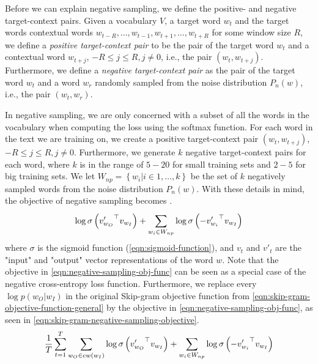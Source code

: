 Before we can explain negative sampling, we define the positive- and negative target-context pairs. Given a vocabulary $V$, a target word $w_t$ and the target words contextual words $w_{t-R}, \ldots, w_{t-1}, w_{t+1}, \ldots, w_{t+R}$ for some window size $R$, we define a \textit{positive target-context pair} to be the pair of the target word $w_t$ and a contextual word $w_{t+j}$, $-R \leq j \leq R, j \neq 0$, i.e., the pair $\left( w_t, w_{t+j} \right)$. Furthermore, we define a \textit{negative target-context pair} as the pair of the target word $w_t$ and a word $w_r$ randomly sampled from the noise distribution $P_n(w)$, i.e., the pair $\left( w_t, w_r \right)$.

In negative sampling, we are only concerned with a subset of all the words in the vocabulary when computing the loss using the softmax function. For each word in the text we are training on, we create a positive target-context pair $\left( w_t, w_{t+j} \right)$, $-R \leq j \leq R, j \neq 0$. Furthermore, we generate $k$ negative target-context pairs for each word, where $k$ is in the range of $5-20$ for small training sets and $2-5$ for big training sets. We let $W_{np} = \left \{ w_i | i \in 1, \ldots, k \right \}$ be the set of $k$ negatively sampled words from the noise distribution $P_n(w)$. With these details in mind, the objective of negative sampling becomes \cite{mikolov2013b, rong2016word2vec}.
\begin{align}
    \log \sigma \left( {v'_{w_O}}^\top v_{w_I} \right) + \sum\limits_{w_i \in W_{np}}^{} \log \sigma \left( -{v'_{w_i}}^\top v_{w_I} \right)
    \label{eqn:negative-sampling-obj-func}
\end{align}
where $\sigma$ is the sigmoid function (\cref{eqn:sigmoid-function}), and $v_t$ and $v'_t$ are the "input" and "output" vector representations of the word $w$. Note that the objective in \cref{eqn:negative-sampling-obj-func} can be seen as a special case of the negative cross-entropy loss function. Furthermore, we replace every $\log p(w_O | w_I)$ in the original Skip-gram objective function from \cref{eqn:skip-gram-objective-function-general} by the objective in \cref{eqn:negative-sampling-obj-func}, as seen in \cref{eqn:skip-gram-negative-sampling-objective}.
\begin{align}
    \frac{1}{T} \sum\limits_{t=1}^{T} \sum\limits_{w_O \in cw(w_I)}^{} \log \sigma \left( {v'_{w_O}}^\top v_{w_I} \right) + \sum\limits_{w_i \in W_{np}}^{} \log \sigma \left( -{v'_{w_i}}^\top v_{w_I} \right)
    \label{eqn:skip-gram-negative-sampling-objective}
\end{align}

